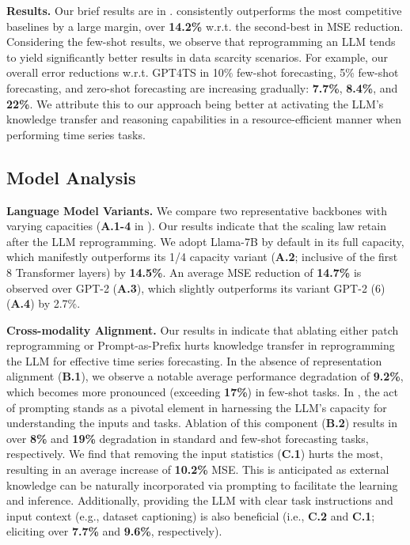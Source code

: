 \noindent\textbf{Results.} Our brief results are in . 
\method consistently outperforms the most competitive baselines by a large margin, over \textbf{14.2\%} w.r.t. the second-best in MSE reduction. Considering the few-shot results, we observe that reprogramming an LLM tends to yield significantly better results in data scarcity scenarios. For example, our overall error reductions w.r.t. GPT4TS in 10\% few-shot forecasting, 5\% few-shot forecasting, and zero-shot forecasting are increasing gradually: \textbf{7.7\%}, \textbf{8.4\%}, and \textbf{22\%}. 
We attribute this to our approach being better at activating the LLM's knowledge transfer and reasoning capabilities in a resource-efficient manner when performing time series tasks.

\vspace{-2mm}
\subsection{Model Analysis}\label{sec:model_analysis}
\vspace{-2mm}
\noindent\textbf{Language Model Variants.}
We compare two representative backbones with varying capacities (\textbf{A.1-4} in ). Our results indicate that the scaling law retain after the LLM reprogramming. We adopt Llama-7B by default in its full capacity, which manifestly outperforms its 1/4 capacity variant (\textbf{A.2}; inclusive of the first 8 Transformer layers) by \textbf{14.5\%}. An average MSE reduction of \textbf{14.7\%} is observed over GPT-2 (\textbf{A.3}), which slightly outperforms its variant GPT-2 (6) (\textbf{A.4}) by 2.7\%.

\noindent\textbf{Cross-modality Alignment.}
Our results in  indicate that ablating either patch reprogramming or Prompt-as-Prefix hurts knowledge transfer in reprogramming the LLM for effective time series forecasting. In the absence of representation alignment (\textbf{B.1}), we observe a notable average performance degradation of \textbf{9.2\%}, which becomes more pronounced (exceeding \textbf{17\%}) in few-shot tasks. In \method, the act of prompting stands as a pivotal element in harnessing the LLM's capacity for understanding the inputs and tasks. Ablation of this component (\textbf{B.2}) results in over \textbf{8\%} and \textbf{19\%} degradation in standard and few-shot forecasting tasks, respectively. We find that removing the input statistics (\textbf{C.1}) hurts the most, resulting in an average increase of \textbf{10.2\%} MSE. This is anticipated as external knowledge can be naturally incorporated via prompting to facilitate the learning and inference. Additionally, providing the LLM with clear task instructions and input context (e.g., dataset captioning) is also beneficial (i.e., \textbf{C.2} and \textbf{C.1}; eliciting over \textbf{7.7\%} and \textbf{9.6\%}, respectively).

